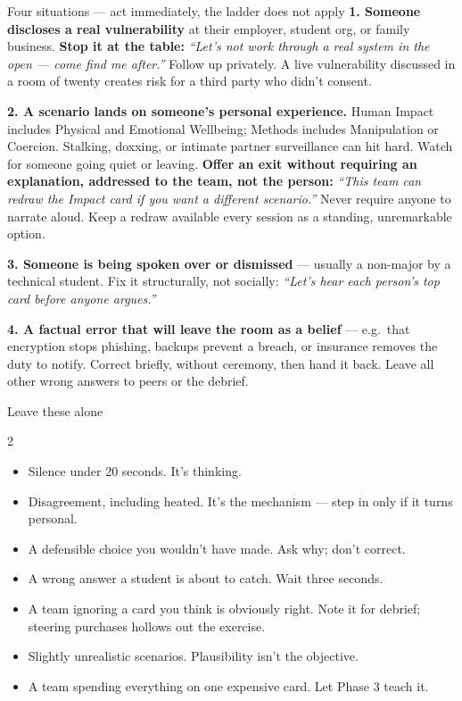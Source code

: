 \documentclass[9pt,letterpaper]{extarticle}
\newcommand{\say}[1]{\textit{``#1''}}
\begin{document}
\vspace{0.7em}
\begin{redbox}{Four situations --- act immediately, the ladder does not apply}
\textbf{1. Someone discloses a real vulnerability} at their employer, student
org, or family business. \textbf{Stop it at the table:} \say{Let's not work
through a real system in the open --- come find me after.} Follow up privately.
A live vulnerability discussed in a room of twenty creates risk for a third
party who didn't consent.
\vspace{0.4em}

\textbf{2. A scenario lands on someone's personal experience.} Human Impact
includes Physical and Emotional Wellbeing; Methods includes Manipulation or
Coercion. Stalking, doxxing, or intimate partner surveillance can hit hard.
Watch for someone going quiet or leaving. \textbf{Offer an exit without
requiring an explanation, addressed to the team, not the person:} \say{This team
can redraw the Impact card if you want a different scenario.} Never require
anyone to narrate aloud. Keep a redraw available every session as a standing,
unremarkable option.
\vspace{0.4em}

\textbf{3. Someone is being spoken over or dismissed} --- usually a non-major by
a technical student. Fix it structurally, not socially: \say{Let's hear each
person's top card before anyone argues.}
\vspace{0.4em}

\textbf{4. A factual error that will leave the room as a belief} --- e.g.\ that
encryption stops phishing, backups prevent a breach, or insurance removes the
duty to notify. Correct briefly, without ceremony, then hand it back. Leave all
other wrong answers to peers or the debrief.
\end{redbox}

\vspace{0.5em}
\begin{greenbox}{Leave these alone}
\begin{multicols}{2}
\begin{itemize}
\item Silence under 20 seconds. It's thinking.
\item Disagreement, including heated. It's the mechanism --- step in only if it
turns personal.
\item A defensible choice you wouldn't have made. Ask why; don't correct.
\item A wrong answer a student is about to catch. Wait three seconds.
\item A team ignoring a card you think is obviously right. Note it for debrief;
steering purchases hollows out the exercise.
\item Slightly unrealistic scenarios. Plausibility isn't the objective.
\item A team spending everything on one expensive card. Let Phase 3 teach it.
\end{itemize}
\end{multicols}
\end{greenbox}
\end{document}
